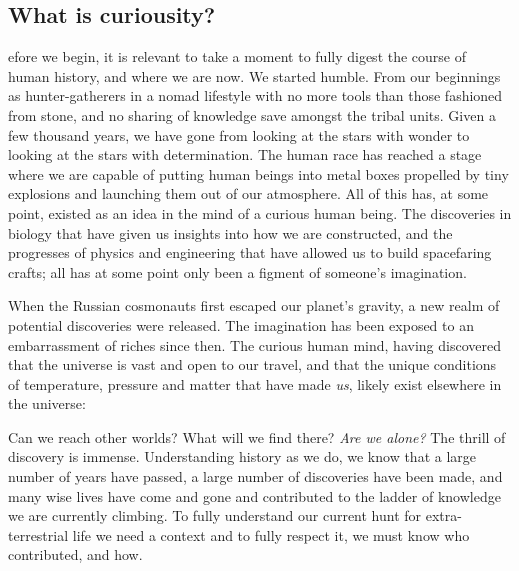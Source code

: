 \subsection{What is curiousity?}
efore we begin, it is relevant to take a moment to fully digest the course of human history, and where we are now.
We started humble.
From our beginnings as hunter-gatherers in a nomad lifestyle with no more tools than those fashioned from stone, and no sharing of knowledge save amongst the tribal units.
Given a few thousand years, we have gone from looking at the stars with wonder to looking at the stars with determination.
The human race has reached a stage where we are capable of putting human beings into metal boxes propelled by tiny explosions and launching them out of our atmosphere.
All of this has, at some point, existed as an idea in the mind of a curious human being.
The discoveries in biology that have given us insights into how we are constructed, and the progresses of physics and engineering that have allowed us to build spacefaring crafts; all has at some point only been a figment of someone's imagination.

When the Russian cosmonauts first escaped our planet's gravity, a new realm of potential discoveries were released.
The imagination has been exposed to an embarrassment of riches since then.
The curious human mind, having discovered that the universe is vast and open to our travel, and that the unique conditions of temperature, pressure and matter that have made \textit{us}, likely exist elsewhere in the universe:

Can we reach other worlds?
What will we find there?
\textit{Are we alone?}
The thrill of discovery is immense.
Understanding history as we do, we know that a large number of years have passed, a large number of discoveries have been made, and many wise lives have come and gone and contributed to the ladder of knowledge we are currently climbing.
To fully understand our current hunt for extra-terrestrial life we need a context and to fully respect it, we must know who contributed, and how.